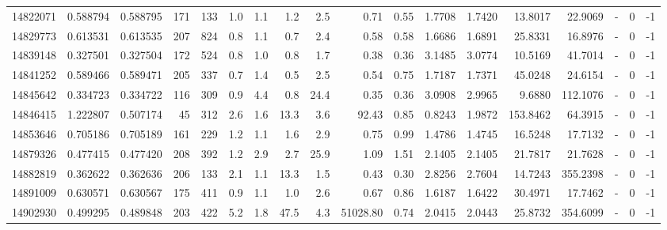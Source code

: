\begin{tabular}{rrrrrrrrrrrrrrrlrr}
  14822071 & 0.588794 &   0.588795 &  171 &  133 &      1.0 &      1.1 &     1.2 &      2.5 &       0.71 &        0.55 &  1.7708 &  1.7420 &   13.8017 &   22.9069 &             - &        0 &         -1 \\
  14829773 & 0.613531 &   0.613535 &  207 &  824 &      0.8 &      1.1 &     0.7 &      2.4 &       0.58 &        0.58 &  1.6686 &  1.6891 &   25.8331 &   16.8976 &             - &        0 &         -1 \\
  14839148 & 0.327501 &   0.327504 &  172 &  524 &      0.8 &      1.0 &     0.8 &      1.7 &       0.38 &        0.36 &  3.1485 &  3.0774 &   10.5169 &   41.7014 &             - &        0 &         -1 \\
  14841252 & 0.589466 &   0.589471 &  205 &  337 &      0.7 &      1.4 &     0.5 &      2.5 &       0.54 &        0.75 &  1.7187 &  1.7371 &   45.0248 &   24.6154 &             - &        0 &         -1 \\
  14845642 & 0.334723 &   0.334722 &  116 &  309 &      0.9 &      4.4 &     0.8 &     24.4 &       0.35 &        0.36 &  3.0908 &  2.9965 &    9.6880 &  112.1076 &             - &        0 &         -1 \\
  14846415 & 1.222807 &   0.507174 &   45 &  312 &      2.6 &      1.6 &    13.3 &      3.6 &      92.43 &        0.85 &  0.8243 &  1.9872 &  153.8462 &   64.3915 &             - &        0 &         -1 \\
  14853646 & 0.705186 &   0.705189 &  161 &  229 &      1.2 &      1.1 &     1.6 &      2.9 &       0.75 &        0.99 &  1.4786 &  1.4745 &   16.5248 &   17.7132 &             - &        0 &         -1 \\
  14879326 & 0.477415 &   0.477420 &  208 &  392 &      1.2 &      2.9 &     2.7 &     25.9 &       1.09 &        1.51 &  2.1405 &  2.1405 &   21.7817 &   21.7628 &             - &        0 &         -1 \\
  14882819 & 0.362622 &   0.362636 &  206 &  133 &      2.1 &      1.1 &    13.3 &      1.5 &       0.43 &        0.30 &  2.8256 &  2.7604 &   14.7243 &  355.2398 &             - &        0 &         -1 \\
  14891009 & 0.630571 &   0.630567 &  175 &  411 &      0.9 &      1.1 &     1.0 &      2.6 &       0.67 &        0.86 &  1.6187 &  1.6422 &   30.4971 &   17.7462 &             - &        0 &         -1 \\
  14902930 & 0.499295 &   0.489848 &  203 &  422 &      5.2 &      1.8 &    47.5 &      4.3 &   51028.80 &        0.74 &  2.0415 &  2.0443 &   25.8732 &  354.6099 &             - &        0 &         -1 \\

\end{tabular}
